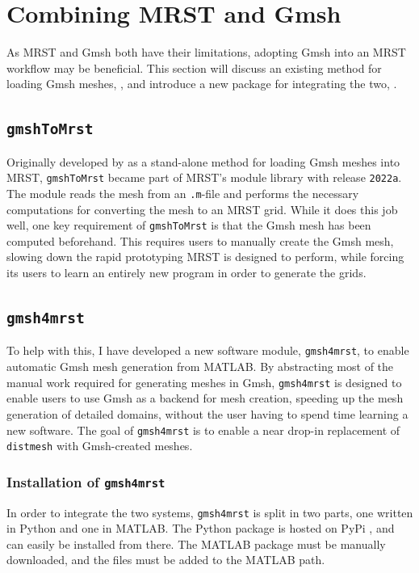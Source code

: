 \section{Combining MRST and Gmsh}
\label{sec:combining}
As MRST and Gmsh both have their limitations, adopting Gmsh into an MRST workflow may be beneficial. This section will discuss an existing method for loading Gmsh meshes, , and introduce a new package for integrating the two, .

\subsection{\texttt{gmshToMrst}}
\label{sec:GmshToMRST}
Originally developed by \textcite{gmsh_to_mrst} as a stand-alone method for loading Gmsh meshes into MRST, \verb|gmshToMrst| became part of MRST's module library with release \verb|2022a|. The module reads the mesh from an \verb|.m|-file and performs the necessary computations for converting the mesh to an MRST grid. While it does this job well, one key requirement of \verb|gmshToMrst| is that the Gmsh mesh has been computed beforehand. This requires users to manually create the Gmsh mesh, slowing down the rapid prototyping MRST is designed to perform, while forcing its users to learn an entirely new program in order to generate the grids.


\subsection{\texttt{gmsh4mrst}}
\label{sec:own_software}
To help with this, I have developed a new software module, \verb|gmsh4mrst|, to enable automatic Gmsh mesh generation from MATLAB. By abstracting most of the manual work required for generating meshes in Gmsh, \verb|gmsh4mrst| is designed to enable users to use Gmsh as a backend for mesh creation, speeding up the mesh generation of detailed domains, without the user having to spend time learning a new software. The goal of \verb|gmsh4mrst| is to enable a near drop-in replacement of \verb|distmesh| with Gmsh-created meshes.


\subsubsection{Installation of \texttt{gmsh4mrst}}
In order to integrate the two systems, \verb|gmsh4mrst| is split in two parts, one written in Python and one in MATLAB. The Python package is hosted on PyPi \cite{gmsh4mrst}, and can easily be installed from there. The MATLAB package must be manually downloaded, and the files must be added to the MATLAB path.

